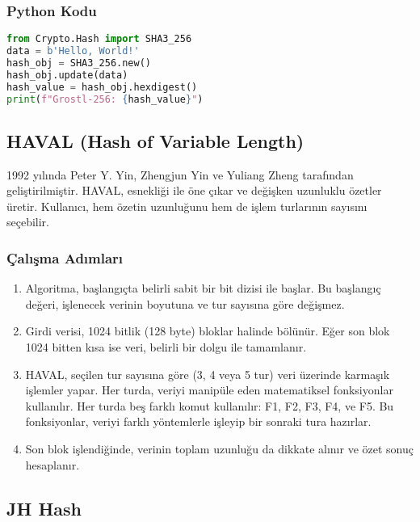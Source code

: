 \subsubsection{Python Kodu}

\begin{lstlisting}[language=Python]
from Crypto.Hash import SHA3_256
data = b'Hello, World!'
hash_obj = SHA3_256.new()
hash_obj.update(data)
hash_value = hash_obj.hexdigest()
print(f"Grostl-256: {hash_value}")
\end{lstlisting}

\newpage

\subsection{HAVAL (Hash of Variable Length)}

1992 yılında Peter Y. Yin, Zhengjun Yin ve Yuliang Zheng tarafından geliştirilmiştir. HAVAL, esnekliği ile öne çıkar ve değişken uzunluklu özetler üretir. Kullanıcı, hem özetin uzunluğunu hem de işlem turlarının sayısını seçebilir.

\subsubsection{Çalışma Adımları}

\begin{enumerate}
    \item Algoritma, başlangıçta belirli sabit bir bit dizisi ile başlar. Bu başlangıç değeri, işlenecek verinin boyutuna ve tur sayısına göre değişmez.
    \item Girdi verisi, 1024 bitlik (128 byte) bloklar halinde bölünür. Eğer son blok 1024 bitten kısa ise veri, belirli bir dolgu ile tamamlanır.
    \item HAVAL, seçilen tur sayısına göre (3, 4 veya 5 tur) veri üzerinde karmaşık işlemler yapar. Her turda, veriyi manipüle eden matematiksel fonksiyonlar kullanılır. Her turda beş farklı komut kullanılır: F1, F2, F3, F4, ve F5. Bu fonksiyonlar, veriyi farklı yöntemlerle işleyip bir sonraki tura hazırlar.
    \item Son blok işlendiğinde, verinin toplam uzunluğu da dikkate alınır ve özet sonuç hesaplanır.
\end{enumerate}

\newpage

\subsection{JH Hash}

